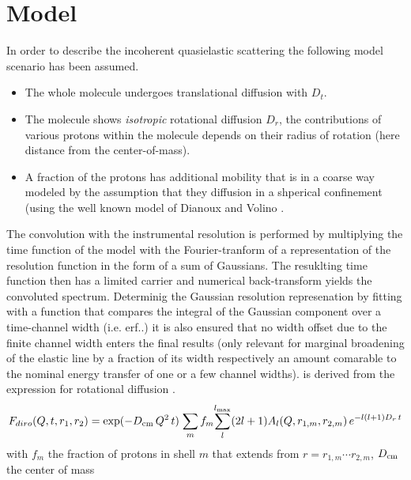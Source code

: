 \documentclass[12pt]{article}
\begin{document}
\section{Model}
\label{sec:model}
In order to describe the incoherent quasielastic scattering the following model scenario 
has been assumed.
\begin{itemize}
\item The whole molecule undergoes translational diffusion with $D_t$.
\item The molecule shows {\it isotropic} rotational diffusion $D_r$, the contributions
of various protons within the molecule depends on their radius of rotation (here distance from
the center-of-mass). 
\item A fraction of the protons has additional mobility that is in a coarse way modeled by
the assumption that they diffusion in a shperical confinement (using the well known model
of Dianoux and Volino \cite{volino80vo}. 
\end{itemize}
The convolution with the instrumental resolution is performed by multiplying the time function
of the model with the Fourier-tranform of a representation of the resolution function in the form
of a sum of Gaussians. The resuklting time function then has a limited carrier and numerical back-transform
yields the convoluted spectrum.
Determinig the Gaussian resolution represenation by fitting with a function that compares the integral
of the Gaussian component over a time-channel width (i.e. erf..) it is also ensured that no
width offset due to the finite channel width enters the final results (only relevant for marginal
broadening of the elastic line by a fraction of its width respectively an amount comarable to the
nominal energy transfer of one or a few channel widths).  
%
%
%       
%
is derived from the expression for rotational diffusion \cite{sears66seaa}. 
\begin{equation}
\label{eq:dirosp}
F_{diro}(Q,t,r_1,r_2) = \exp(-D_{\rm cm} \, Q^2 \, t) \; { \sum_m f_m { \sum_l^{l_{\rm max}} (2l+1) A_l(Q,r_{1,m},r_{2,m}) \, e^{-l(l+1)D_r\,t}  } }  
\end{equation}
with $f_m$ the fraction of protons in shell $m$ that extends from $r=r_{1,m} \cdots r_{2,m}$, $D_{\rm cm}$ the center of mass
\end{document}
